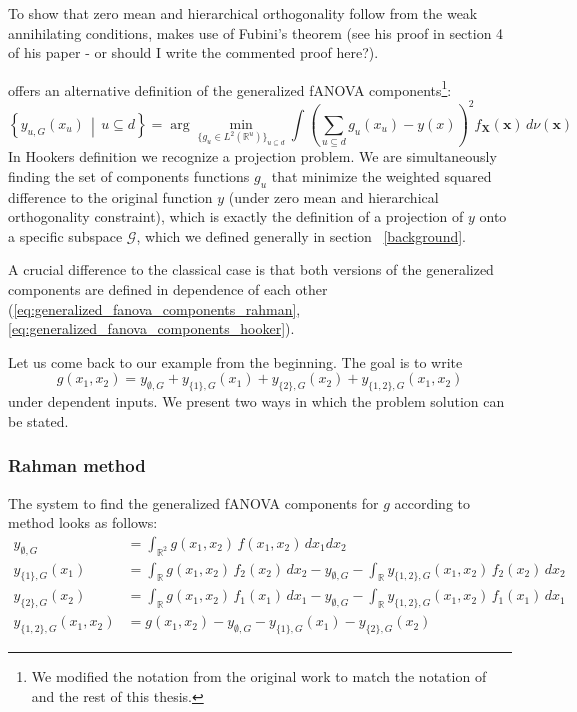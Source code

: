 To show that zero mean and hierarchical orthogonality follow from the weak annihilating conditions, \cite{rahman2014} makes use of Fubini's theorem (see his proof in section 4 of his paper - or should I write the commented proof here?).\par

\cite{hooker2007} offers an alternative definition of the generalized fANOVA components\footnote{We modified the notation from the original work to match the notation of \cite{rahman2014} and the rest of this thesis.}:
\begin{equation}
\left\{ y_{u, G}(x_u) \,\middle|\, u \subseteq d \right\}
= \arg\min_{\{g_u \in L^2(\mathbb{R}^u)\}_{u \subseteq d}} 
\int \left( \sum_{u \subseteq d} g_u(x_u) - y(x) \right)^2 f_{\boldsymbol{X}}(\boldsymbol{x}) \, d \nu (\boldsymbol{x})
\label{eq:generalized_fanova_components_hooker}
\end{equation}
In Hookers definition we recognize a projection problem. We are simultaneously finding the set of components functions $g_u$ that minimize the weighted squared difference to the original function $y$ (under zero mean and hierarchical orthogonality constraint), which is exactly the definition of a projection of $y$ onto a specific subspace $\mathcal{G}$, which we defined generally in section ~\ref{background}.\par

A crucial difference to the classical case is that both versions of the generalized components are defined in dependence of each other (\autoref{eq:generalized_fanova_components_rahman}, \autoref{eq:generalized_fanova_components_hooker}).

Let us come back to our example from the beginning. The goal is to write
\[
g(x_1, x_2) = y_{\emptyset, G} + y_{\{1\}, G}(x_1) + y_{\{2\}, G}(x_2) + y_{\{1,2\}, G}(x_1, x_2)
\]
under dependent inputs. We present two ways in which the problem solution can be stated.\par

\subsubsection*{Rahman method}
The system to find the generalized fANOVA components for $g$ according to \cite{rahman2014} method looks as follows:
\begin{align}
    y_{\emptyset, G} &= \int_{\mathbb{R}^2} g(x_1, x_2)\, f(x_1, x_2)\, dx_1 dx_2 \label{eq:y0} \\
    y_{\{1\}, G}(x_1) &= \int_{\mathbb{R}} g(x_1, x_2)\, f_2(x_2)\, dx_2
    - y_{\emptyset, G}
    - \int_{\mathbb{R}} y_{\{1,2\}, G}(x_1, x_2)\, f_2(x_2)\, dx_2 \label{eq:y1} \\
    y_{\{2\}, G}(x_2) &= \int_{\mathbb{R}} g(x_1, x_2)\, f_1(x_1)\, dx_1
    - y_{\emptyset, G}
    - \int_{\mathbb{R}} y_{\{1,2\}, G}(x_1, x_2)\, f_1(x_1)\, dx_1 \label{eq:y2} \\
    y_{\{1,2\}, G}(x_1, x_2) &= g(x_1, x_2) - y_{\emptyset, G} - y_{\{1\}, G}(x_1) - y_{\{2\}, G}(x_2) \label{eq:y12}
\end{align}

